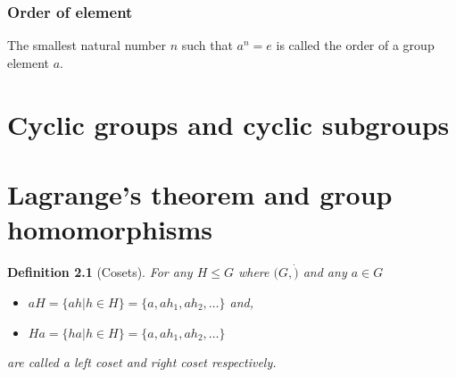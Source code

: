 \documentclass[oneside,11pt,pdftex]{book}%
\numberwithin{equation}{section}
\newtheorem{definition}[theorem]{Definition}
\numberwithin{section}{chapter}
\numberwithin{equation}{chapter}
\begin{document}
\subsection{Order of element}
The smallest natural number $ n $ such that $ a^n=e $ is called the order of a group element $ a $.

\chapter{Cyclic groups and cyclic subgroups}

\chapter{Lagrange's theorem and group homomorphisms}


\begin{definition}[Cosets]
	For any $ H \leq G $ where $ (G,\dot) $ and any $ a \in G $
	\begin{itemize}
		\item $ aH=\{ah|h \in H \} = \{a, ah_1,ah_2,\dots \} $ and,
		\item $ Ha=\{ha|h\in H\}=\{a,ah_1,ah_2,\dots\} $
	\end{itemize}
	are called a left coset and right coset respectively.
\end{definition}
\end{document}
